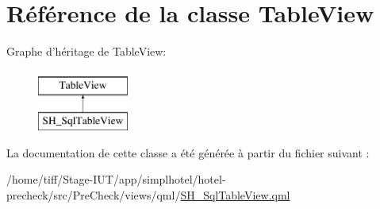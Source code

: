 \hypertarget{classTableView}{\section{Référence de la classe Table\-View}
\label{classTableView}
}
Graphe d'héritage de Table\-View\-:\begin{figure}[H]
\begin{center}
\leavevmode
\includegraphics[height=2.000000cm]{classTableView}
\end{center}
\end{figure}


La documentation de cette classe a été générée à partir du fichier suivant \-:\begin{DoxyCompactItemize}
\item 
/home/tiff/\-Stage-\/\-I\-U\-T/app/simplhotel/hotel-\/precheck/src/\-Pre\-Check/views/qml/\hyperlink{SH__SqlTableView_8qml}{S\-H\-\_\-\-Sql\-Table\-View.\-qml}\end{DoxyCompactItemize}
